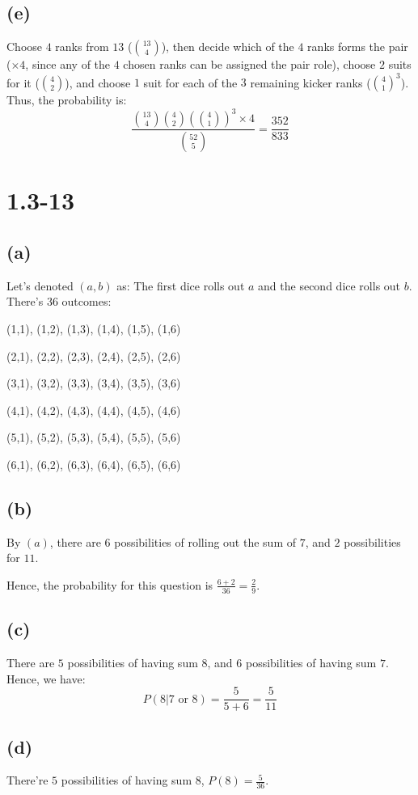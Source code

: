 \documentclass[12pt]{article}
\begin{document}
\subsection*{(e)}
Choose $4$ ranks from $13$ ($\binom{13}{4}$), then decide which of the $4$ ranks forms the pair ($\times 4$, since any of the $4$ chosen ranks can be assigned the pair role), choose $2$ suits for it ($\binom{4}{2}$), and choose $1$ suit for each of the $3$ remaining kicker ranks ($\binom{4}{1}^3$). Thus, the probability is:
\[\frac{\binom{13}{4}\binom{4}{2}(\binom{4}{1})^3\times 4}{\binom{52}{5}}=\frac{352}{833}\]
\section*{1.3-13}
\subsection*{(a)}
Let's denoted $(a,b)$ as: The first dice rolls out $a$ and the second dice rolls out $b$. There's $36$ outcomes:

\noindent(1,1), (1,2), (1,3), (1,4), (1,5), (1,6)

\noindent(2,1), (2,2), (2,3), (2,4), (2,5), (2,6)

\noindent(3,1), (3,2), (3,3), (3,4), (3,5), (3,6)

\noindent(4,1), (4,2), (4,3), (4,4), (4,5), (4,6)

\noindent(5,1), (5,2), (5,3), (5,4), (5,5), (5,6)

\noindent(6,1), (6,2), (6,3), (6,4), (6,5), (6,6)

\subsection*{(b)}
By $(a)$, there are $6$ possibilities of rolling out the sum of $7$, and $2$ possibilities for $11$.

Hence, the probability for this question is $\frac{6+2}{36}=\frac{2}{9}$.
\subsection*{(c)}
There are $5$ possibilities of having sum $8$, and $6$ possibilities of having sum $7$. Hence, we have:
\[P(8|\text{7 or 8})=\frac{5}{5+6}=\frac{5}{11}\]
\subsection*{(d)}
There're $5$ possibilities of having sum $8$, $P(8)=\frac{5}{36}$.
\end{document}
